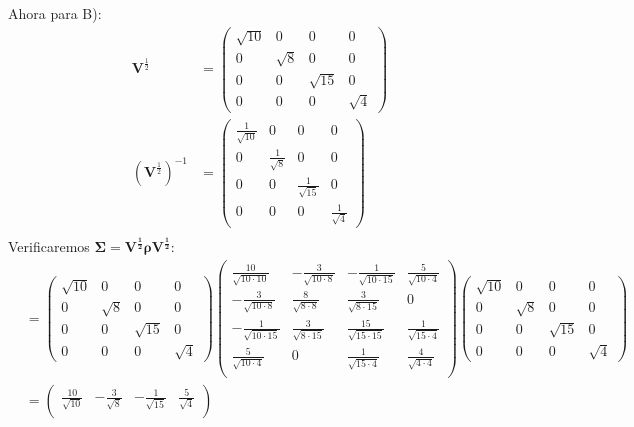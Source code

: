 \begin{sol}
Ahora para B):
\begin{align*}\mathbf{V}^{\frac{1}{2}} &=
\begin{pmatrix}
\sqrt{10} & 0 & 0 & 0\\
0 & \sqrt{8} & 0 & 0\\
0 & 0 & \sqrt{15} & 0\\
0 &0 &0 & \sqrt{4}
\end{pmatrix}\\ 
(\mathbf{V}^{\frac{1}{2}})^{-1} &= 
\begin{pmatrix}
\frac{1}{\sqrt{10}} & 0 & 0 & 0\\
0 &\frac{1}{\sqrt{8}}  & 0 & 0\\
0 & 0 & \frac{1}{\sqrt{15}}  & 0\\
0 &0 &0 & \frac{1}{\sqrt{4}} 
\end{pmatrix}\\ 
\end{align*}
Verificaremos $\mathbf{\Sigma}=\mathbf{V^{\frac{1}{2}} \rho V^{\frac{1}{2}}}$:
\begin{align*}
&=\begin{pmatrix}
\sqrt{10} & 0 & 0 & 0\\
0 & \sqrt{8} & 0 & 0\\
0 & 0 & \sqrt{15} & 0\\
0 &0 &0 & \sqrt{4}
\end{pmatrix}
\begin{pmatrix}
\frac{10}{\sqrt{10 \cdot 10}} & -\frac{3}{\sqrt{10 \cdot 8}} & -\frac{1}{\sqrt{10 \cdot 15}} & \frac{5}{\sqrt{10 \cdot 4}} \\
-\frac{3}{\sqrt{10 \cdot 8}} & \frac{8}{\sqrt{8 \cdot 8}} & \frac{3}{\sqrt{8 \cdot 15}} & 0 \\
 -\frac{1}{\sqrt{10 \cdot 15}} & \frac{3}{\sqrt{8 \cdot 15}} & \frac{15}{\sqrt{15 \cdot 15}} & \frac{1}{\sqrt{15 \cdot 4}} \\
 \frac{5}{\sqrt{10 \cdot 4}} &0 &\frac{1}{\sqrt{15 \cdot 4}}  & \frac{4}{\sqrt{4 \cdot 4}} \\
\end{pmatrix}
\begin{pmatrix}
\sqrt{10} & 0 & 0 & 0\\
0 & \sqrt{8} & 0 & 0\\
0 & 0 & \sqrt{15} & 0\\
0 &0 &0 & \sqrt{4}
\end{pmatrix} \\
&= 
\begin{pmatrix}
\frac{10}{\sqrt{10}} & -\frac{3}{\sqrt{8}} & -\frac{1}{\sqrt{15}} & \frac{5}{\sqrt{4}} \\

\end{pmatrix}
\end{align*}
\end{sol}

